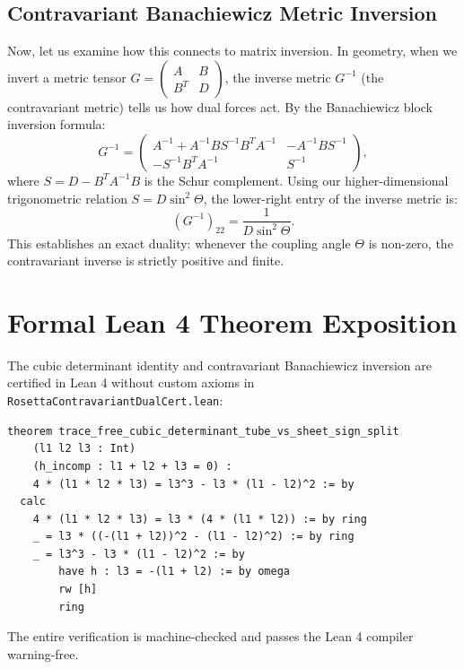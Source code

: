 \documentclass[11pt,a4paper]{article}
\theoremstyle{definition}
\begin{document}
\subsection{Contravariant Banachiewicz Metric Inversion}
Now, let us examine how this connects to matrix inversion. In geometry, when we invert a metric tensor $G = \begin{pmatrix} A & B \\ B^T & D \end{pmatrix}$, the inverse metric $G^{-1}$ (the contravariant metric) tells us how dual forces act. By the Banachiewicz block inversion formula:
\begin{equation}
G^{-1} = \begin{pmatrix} A^{-1} + A^{-1} B S^{-1} B^T A^{-1} & -A^{-1} B S^{-1} \\ -S^{-1} B^T A^{-1} & S^{-1} \end{pmatrix},
\end{equation}
where $S = D - B^T A^{-1} B$ is the Schur complement. Using our higher-dimensional trigonometric relation $S = D \sin^2\Theta$, the lower-right entry of the inverse metric is:
\begin{equation}
(G^{-1})_{22} = \frac{1}{D \sin^2\Theta}.
\end{equation}
This establishes an exact duality: whenever the coupling angle $\Theta$ is non-zero, the contravariant inverse is strictly positive and finite.


\section{Formal Lean 4 Theorem Exposition}

The cubic determinant identity and contravariant Banachiewicz inversion are certified in Lean 4 without custom axioms in \texttt{RosettaContravariantDualCert.lean}:

\begin{lstlisting}[language=Lean4]
theorem trace_free_cubic_determinant_tube_vs_sheet_sign_split
    (l1 l2 l3 : Int)
    (h_incomp : l1 + l2 + l3 = 0) :
    4 * (l1 * l2 * l3) = l3^3 - l3 * (l1 - l2)^2 := by
  calc
    4 * (l1 * l2 * l3) = l3 * (4 * (l1 * l2)) := by ring
    _ = l3 * ((-(l1 + l2))^2 - (l1 - l2)^2) := by ring
    _ = l3^3 - l3 * (l1 - l2)^2 := by
        have h : l3 = -(l1 + l2) := by omega
        rw [h]
        ring
\end{lstlisting}

The entire verification is machine-checked and passes the Lean 4 compiler warning-free.
\end{document}
